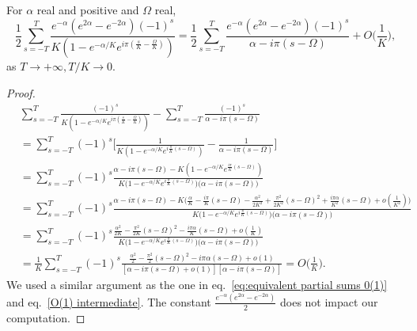 \begin{lemma}\label{appendix lemma 12.3}
For $\alpha$ real and positive and $\Omega$ real,
\begin{equation*}
    \frac{1}{2}\sum_{s=-T}^T\frac{e^{-\alpha}(e^{2\alpha}-e^{-2\alpha})(-1)^s}{K(1 - e^{-\alpha/K}e^{i\pi(\frac{s}{K}-\frac{\Omega}{K})})} = \frac{1}{2}\sum_{s=-T}^T\frac{e^{-\alpha}(e^{2\alpha}-e^{-2\alpha})(-1)^s}{\alpha - i\pi (s-\Omega)} + O\big(\frac{1}{K}\big),
\end{equation*}
as $T\rightarrow+\infty, T/K\rightarrow 0$.
    
\end{lemma}

\begin{proof}
    \begin{align*}
         &\sum_{s=-T}^T\frac{(-1)^s}{K(1 - e^{-\alpha/K}e^{i\pi(\frac{s}{K}-\frac{\Omega}{K})})} - \sum_{s=-T}^T\frac{(-1)^s}{\alpha - i\pi (s-\Omega)}\\
         &= \sum_{s=-T}^T(-1)^s\big[\frac{1}{K(1-e^{-\alpha/K}e^{i\frac{\pi}{K}(s-\Omega)})} - \frac{1}{\alpha -i\pi (s - \Omega)}\big]\\
         &= \sum_{s=-T}^T(-1)^s\frac{\alpha -i\pi(s-\Omega)-K(1 - e^{-\alpha/K}e^{\frac{i\pi}{K}(s-\Omega)})}{K\big(1-e^{-\alpha/K}e^{i\frac{\pi}{K}(s-\Omega)}\big)\big(\alpha - i\pi (s-\Omega)\big)}\\
         &= \sum_{s=-T}^T(-1)^s\frac{\alpha - i\pi(s-\Omega) - K\big(\frac{\alpha}{K} - \frac{i\pi}{K}(s-\Omega) - \frac{\alpha^2}{2K^2} + \frac{\pi^2}{2K^2}(s-\Omega)^2 + \frac{i\pi\alpha}{K^2}(s-\Omega)+o(\frac{1}{K^2})\big)}{K\big(1-e^{-\alpha/K}e^{i\frac{\pi}{K}(s-\Omega)}\big)\big(\alpha - i\pi (s-\Omega)\big)}\\
         &= \sum_{s=-T}^T(-1)^s\frac{\frac{\alpha^2}{2K} - \frac{\pi^2}{2K}(s-\Omega)^2 - \frac{i\pi\alpha}{K}(s-\Omega) + o(\frac{1}{K})}{K\big(1-e^{-\alpha/K}e^{i\frac{\pi}{K}(s-\Omega)}\big)\big(\alpha - i\pi (s-\Omega)\big)}\\
         &=\frac{1}{K}\sum_{s=-T}^T(-1)^s\frac{\frac{\alpha^2}{2} - \frac{\pi^2}{2}(s-\Omega)^2-i\pi\alpha(s-\Omega)+o(1)}{[\alpha-i\pi(s-\Omega)+o(1)][\alpha-i\pi(s-\Omega)]}=O\big(\frac{1}{K}\big).
    \end{align*}
    We used a similar argument as the one in eq.~\eqref{eq:equivalent partial sums 0(1)} and eq.~\eqref{O(1) intermediate}.
    The constant $\frac{e^{-\alpha}(e^{2\alpha}-e^{-2\alpha})}{2}$ does not impact our computation. 
\end{proof}
    
